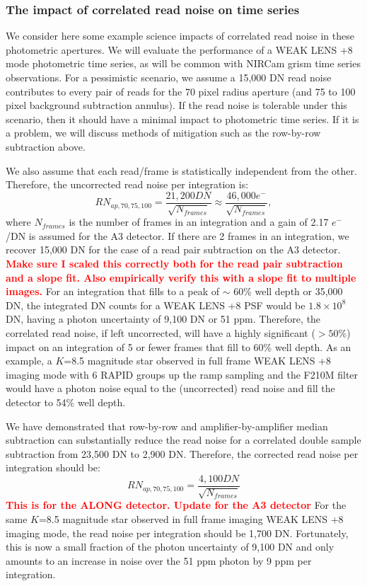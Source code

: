 \documentclass{aastex62}
\begin{document}
\subsubsection{The impact of correlated read noise on time series}
We consider here some example science impacts of correlated read noise in these photometric apertures.
We will evaluate the performance of a WEAK LENS +8 mode photometric time series, as will be common with NIRCam grism time series observations.
For a pessimistic scenario, we assume a 15,000 DN read noise contributes to every pair of reads for the 70 pixel radius aperture (and 75 to 100 pixel background subtraction annulus).
If the read noise is tolerable under this scenario, then it should have a minimal impact to photometric time series.
If it is a problem, we will discuss methods of mitigation such as the row-by-row subtraction above.

We also assume that each read/frame is statistically independent from the other.
Therefore, the uncorrected read noise per integration is:
\begin{equation}
RN_{ap,70,75,100} = \frac{21,200 DN}{ \sqrt{N_{frames}}} \approx \frac{46,000 e^-}{ \sqrt{N_{frames}}},
\end{equation}
where $N_{frames}$ is the number of frames in an integration and a gain of 2.17 $e^-$/DN is assumed for the A3 detector.
If there are 2 frames in an integration, we recover 15,000 DN for the case of a read pair subtraction on the A3 detector.
\textcolor{red}{\bf Make sure I scaled this correctly both for the read pair subtraction and a slope fit. Also empirically verify this with a slope fit to multiple images.}
For an integration that fills to a peak of $\sim$ 60\% well depth or 35,000 DN, the integrated DN counts for a WEAK LENS +8 PSF would be $1.8 \times10^8$ DN, having a photon uncertainty of 9,100 DN or 51 ppm.
Therefore, the correlated read noise, if left uncorrected, will have a highly significant ($>50\%$) impact on an integration of 5 or fewer frames that fill to 60\% well depth.
As an example, a $K$=8.5 magnitude star observed in full frame WEAK LENS +8 imaging mode with 6 RAPID groups up the ramp sampling and the F210M filter would have a photon noise equal to the (uncorrected) read noise and fill the detector to 54\% well depth.

We have demonstrated that row-by-row and amplifier-by-amplifier median subtraction can substantially reduce the read noise for a correlated double sample subtraction from 23,500 DN to 2,900 DN.
Therefore, the corrected read noise per integration should be:
\begin{equation}
RN_{ap,70,75,100} = \frac{4,100 DN}{ \sqrt{N_{frames}}}
\end{equation}
\textcolor{red}{\bf This is for the ALONG detector.
Update for the A3 detector}
For the same $K$=8.5 magnitude star observed in full frame imaging WEAK LENS +8 imaging mode, the read noise per integration should be 1,700 DN.
Fortunately, this is now a small fraction of the photon uncertainty of 9,100 DN and only amounts to an increase in noise over the 51 ppm photon by 9 ppm per integration.
\end{document}
